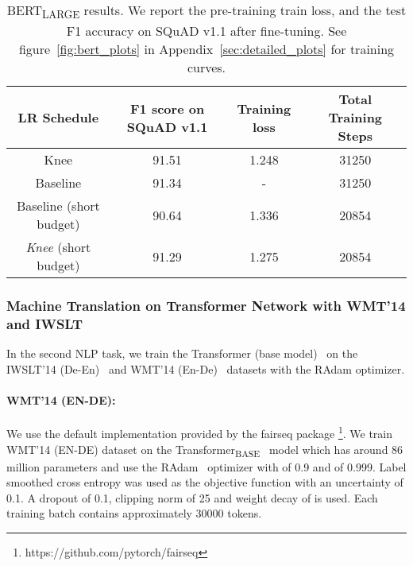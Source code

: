 \documentclass[twoside,11pt]{article}
\newcommand{\lrscheduleshort}{\textit{Knee}}
\begin{document}
\vspace{-4pt}
\begin{table}[h]
\small
\centering
\caption{BERT\textsubscript{LARGE} results. We report the pre-training train loss, and the test F1 accuracy on SQuAD v1.1 after fine-tuning. See figure~\ref{fig:bert_plots} in Appendix~\ref{sec:detailed_plots} for training curves.}
\label{tab:bert_pretraining}
\begin{tabular}{cccc}
\toprule
LR Schedule  & F1 score on SQuAD v1.1 & Training loss & Total Training Steps \\ 
\midrule
Knee & 91.51  & 1.248 & 31250\\
Baseline \citep{bert76lamb} &  91.34 & - & 31250 \\
Baseline (short budget)   & 90.64  & 1.336 & 20854\\
\lrscheduleshort{} (short budget)  & 91.29 & 1.275 & 20854\\
\bottomrule
\end{tabular}
\end{table}


\subsubsection{Machine Translation on Transformer Network with WMT'14 and IWSLT}

In the second NLP task, we train the Transformer (base model)~\citep{vaswani2017attention} on the IWSLT'14 (De-En)~\citep{iwslt_dataset_cettolo2014} and  WMT'14 (En-De)~\citep{wmt14translation}   datasets with the RAdam \citep{liu2019variance_radam} optimizer.


\paragraph{WMT'14 (EN-DE):}We use the default implementation provided by the fairseq package \citep{ott2019fairseq} \footnote{https://github.com/pytorch/fairseq}. We train WMT'14 (EN-DE) dataset on the Transformer\textsubscript{BASE}~\citep{vaswani2017attention} model which has around 86 million parameters and use the RAdam~\citep{liu2019variance_radam} optimizer with  of 0.9 and  of 0.999. Label smoothed cross entropy was used as the objective function with an uncertainty of 0.1. A dropout of 0.1, clipping norm of 25 and weight decay of  is used. Each training batch contains approximately 30000 tokens.
\end{document}

